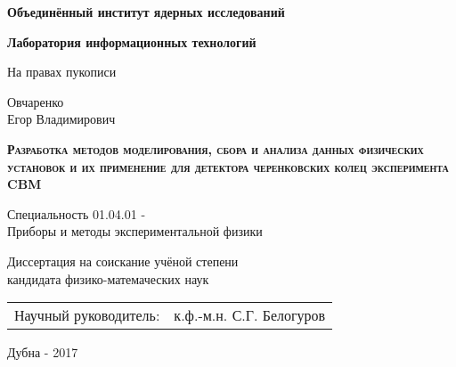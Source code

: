 \begin{titlepage}

\centering

\textbf{
Объединённый институт ядерных исследований
}


\textbf{
Лаборатория информационных технологий
}

\vspace{2cm}

\begin{flushright}
На правах пукописи
\end{flushright}

\vspace{1cm}

Овчаренко \\
Егор Владимирович

\vspace{2cm}

\textbf{
\textsc{
Разработка методов моделирования, сбора и анализа данных
физических установок и их применение для детектора черенковских
колец эксперимента CBM
}
}

\vspace{3cm}

Специальность 01.04.01 - \\
Приборы и методы экспериментальной физики

\vspace{2cm}

Диссертация на соискание учёной степени \\
кандидата физико-матемаческих наук

\vspace{2cm}

\begin{tabu} to \textwidth { X[l] X[r] }
	{Научный руководитель:} & {к.ф.-м.н. С.Г. Белогуров} \\
\end{tabu}

\vspace{6cm}

Дубна - 2017

\end{titlepage}
